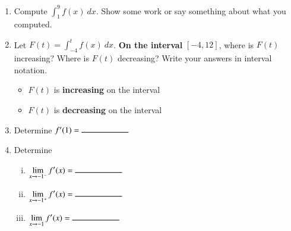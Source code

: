 \documentclass[12pt]{article}
\renewcommand{\emph}[1]{\textsf{\textbf{#1}}}
\newcommand{\blank}[1]{\rule{#1}{0.75pt}}
\let\ds\displaystyle
\newcounter{probcount}
\newcounter{subprobcount}
\newenvironment{subproblems}{%
\begin{enumerate}%
\setcounter{enumi}{\value{subprobcount}}%
\renewcommand{\theenumi}{\emph{\alph{enumi}}}}%
{\setcounter{subprobcount}{\value{enumi}}\end{enumerate}}
\newcommand{\be}{\begin{enumerate}}
\newcommand{\ee}{\end{enumerate}}
\begin{document}
\begin{subproblems}
\item Compute $\ds{\int_{1}^{9}f(x) \ dx}$. Show some work or say something about what you computed.

\vfill


\item  Let $\ds{F(t) = \int_{-4}^{t} f(x) \ dx}$. 
\emph{On the interval} $[-4, 12]$, where is $F(t)$ increasing? Where is $F(t)$ decreasing? Write your answers in interval notation.%

\smallskip

\begin{itemize}
	
\item $F(t)$ is \emph{increasing} on the interval \hrulefill %

\medskip

\item $F(t)$ is \emph{decreasing} on the interval \hrulefill%

\end{itemize}

\bigskip

\item Determine $f'(1) = \blank{2cm}$

\bigskip

\item Determine %
\be[(i)]
\item $\ds\lim_{x \to -1^{-}} f'(x) = \blank{2cm}$
\item $\ds\lim_{x \to -1^{+}} f'(x) = \blank{2cm}$
\item $\ds\lim_{x \to -1} f'(x) = \blank{2cm}$
\ee

\end{subproblems}

\newpage
\end{document}
